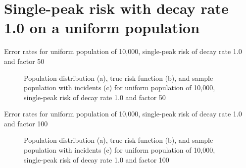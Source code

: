\section{Single-peak risk with decay rate 1.0 on a uniform population}
\label{sec:app:results_unif_1.0_1h}

\graphicspath{{./results/unif_50_1.0_1h/}}
\makeatletter
{}
\makeatother

\begin{table}[H]
    
    \caption[]{Error rates for uniform population of 10,000, single-peak risk of decay rate 1.0 and factor 50}
    \label{tab:mean_error_rates:unif_50_1.0_1h}
\end{table}

\begin{figure}[H]
    
    \caption[]{Population distribution (a), true risk function (b), and sample population with incidents (c) for uniform population of 10,000, single-peak risk of decay rate 1.0 and factor 50}
    \label{fig:distributions:unif_50_1.0_1h}    
\end{figure}


\graphicspath{{./results/unif_100_1.0_1h/}}
\makeatletter
{}
\makeatother

\begin{table}[H]

\caption[]{Error rates for uniform population of 10,000, single-peak risk of decay rate 1.0 and factor 100}
\label{tab:mean_error_rates:unif_100_1.0_1h}
\end{table}

\begin{figure}[H]
    
    \caption[]{Population distribution (a), true risk function (b), and sample population with incidents (c) for uniform population of 10,000, single-peak risk of decay rate 1.0 and factor 100}
    \label{fig:distributions:unif_100_1.0_1h}    
\end{figure}


\graphicspath{{./results/unif_200_1.0_1h/}}
\makeatletter
{}
\makeatother

